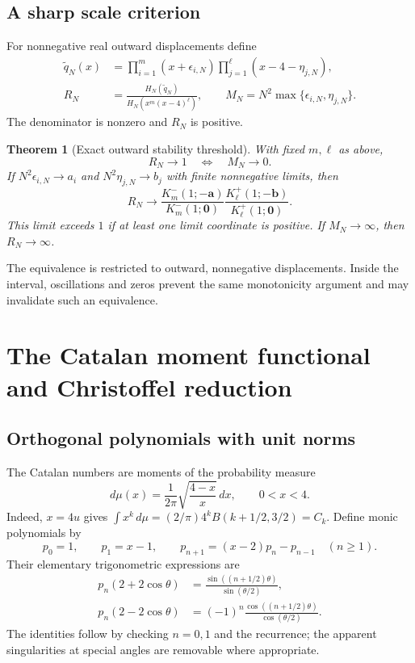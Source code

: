 \documentclass[11pt,a4paper]{article}
\numberwithin{equation}{section}
\newtheorem{theorem}{Theorem}[section]
\theoremstyle{definition}
\theoremstyle{remark}
\newcommand{\ba}{\boldsymbol a}
\newcommand{\bb}{\boldsymbol b}
\begin{document}
\subsection{A sharp scale criterion}
For nonnegative real outward displacements define
\begin{align}
 \widetilde q_N(x)&=\prod_{i=1}^m(x+\epsilon_{i,N})
             \prod_{j=1}^{\ell}(x-4-\eta_{j,N}),\\
 R_N&=\frac{H_N(\widetilde q_N)}{H_N(x^m(x-4)^\ell)},\qquad
 M_N=N^2\max\{\epsilon_{i,N},\eta_{j,N}\}.\label{tec:eq:R}
\end{align}
The denominator is nonzero and $R_N$ is positive.
\begin{theorem}[Exact outward stability threshold]\label{tec:thm:scale}
With fixed $m,\ell$ as above,
\begin{equation}\label{tec:eq:iff}
 R_N\longrightarrow1\quad\Longleftrightarrow\quad M_N\longrightarrow0.
\end{equation}
If $N^2\epsilon_{i,N}\to a_i$ and $N^2\eta_{j,N}\to b_j$ with finite
nonnegative limits, then
\begin{equation}\label{tec:eq:finiteprofile}
 R_N\longrightarrow
 \frac{K_m^-(1;-\ba)}{K_m^-(1;\boldsymbol0)}
 \frac{K_\ell^+(1;-\bb)}{K_\ell^+(1;\boldsymbol0)}.
\end{equation}
This limit exceeds $1$ if at least one limit coordinate is positive.
If $M_N\to\infty$, then $R_N\to\infty$.
\end{theorem}
The equivalence is restricted to outward, nonnegative displacements.
Inside the interval, oscillations and zeros prevent the same monotonicity
argument and may invalidate such an equivalence.

\section{The Catalan moment functional and Christoffel reduction}\label{tec:sec:christoffel}
\subsection{Orthogonal polynomials with unit norms}
The Catalan numbers are moments of the probability measure
\begin{equation}\label{tec:eq:measure}
 d\mu(x)=\frac1{2\pi}\sqrt{\frac{4-x}{x}}\,dx,\qquad 0<x<4.
\end{equation}
Indeed, $x=4u$ gives
$\int x^k\,d\mu=(2/\pi)4^k B(k+1/2,3/2)=C_k$.
Define monic polynomials by
\begin{equation}\label{tec:eq:pn}
 p_0=1,\qquad p_1=x-1,\qquad
 p_{n+1}=(x-2)p_n-p_{n-1}\quad(n\ge1).
\end{equation}
Their elementary trigonometric expressions are
\begin{align}
 p_n(2+2\cos\theta)
   &=\frac{\sin((n+1/2)\theta)}{\sin(\theta/2)},\label{tec:eq:ptrigplus}\\
 p_n(2-2\cos\theta)
   &=(-1)^n\frac{\cos((n+1/2)\theta)}{\cos(\theta/2)}.
   \label{tec:eq:ptrigminus}
\end{align}
The identities follow by checking $n=0,1$ and the recurrence; the
apparent singularities at special angles are removable where appropriate.
\end{document}
